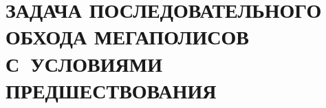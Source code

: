 
\chapter{
  ЗАДАЧА ПОСЛЕДОВАТЕЛЬНОГО ОБХОДА МЕГАПОЛИСОВ
  С~УСЛОВИЯМИ ПРЕДШЕСТВОВАНИЯ
}
\setcounter{chapter}{3}
\setcounter{equation}{0}







